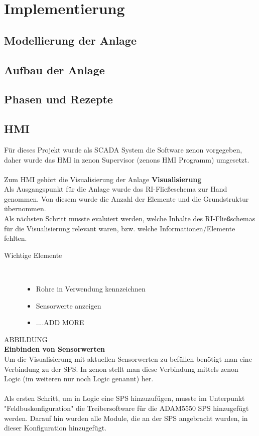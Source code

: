 \chapter{Implementierung} \label{chapter:thevetestcase}
\section{Modellierung der Anlage}
\section{Aufbau der Anlage}
\section{Phasen und Rezepte}
\section{HMI}
Für dieses Projekt wurde als SCADA System die Software zenon vorgegeben, daher wurde das HMI in zenon Supervisor (zenons HMI Programm) umgesetzt.\\
\\
Zum HMI gehört die Visualisierung der Anlage
\textbf{Visualisierung}\\
Als Ausgangspunkt für die Anlage wurde das RI-Fließeschema zur Hand genommen. Von diesem wurde die Anzahl der Elemente und die Grundstruktur übernommen.\\
Als nächsten Schritt musste evaluiert werden, welche Inhalte des RI-Fließschemas für die Visualisierung relevant waren, bzw. welche Informationen/Elemente fehlten.
\begin{description}
\item[Wichtige Elemente]~\par
	\begin{itemize}
		\item Rohre in Verwendung kennzeichnen
		\item Sensorwerte anzeigen
		\item ....ADD MORE
	\end{itemize}
\end{description}
ABBILDUNG\\

\textbf{Einbinden von Sensorwerten}\\
Um die Visualisierung mit aktuellen Sensorwerten zu befüllen benötigt man eine Verbindung zu der SPS. In zenon stellt man diese Verbindung mittels zenon Logic (im weiteren nur noch Logic genannt) her.\\
\\
Als ersten Schritt, um in Logic eine SPS hinzuzufügen, musste im Unterpunkt "Feldbuskonfiguration" die Treibersoftware für die ADAM5550 SPS hinzugefügt werden. Darauf hin wurden alle Module, die an der SPS angebracht wurden, in dieser Konfiguration hinzugefügt. 

